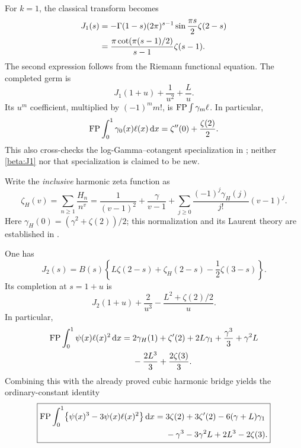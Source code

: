 For $k=1$, the classical transform becomes
\begin{align}\label{beta:J1}
 J_1(s)&=-\Gamma(1-s)(2\pi)^{s-1}
                \sin\frac{\pi s}{2}\zeta(2-s)\notag\\
 &=\frac{\pi\cot(\pi(s-1)/2)}{s-1}\zeta(s-1).
\end{align}
The second expression follows from the Riemann functional equation.
The completed germ is
\begin{equation}\label{beta:J1completion}
 J_1(1+u)+\frac1{u^2}+\frac L u.
\end{equation}
Its $u^m$ coefficient, multiplied by $(-1)^m m!$, is
$\operatorname{FP}\int\gamma_m\ell$. In particular,
\begin{equation}\label{beta:firstmoment}
 \operatorname{FP}\int_0^1\gamma_0(x)\ell(x)\,\mathrm d x
 =\zeta''(0)+\frac{\zeta(2)}2.
\end{equation}
This also cross-checks the log-Gamma--cotangent specialization in
\cite{RepoExact}; neither \eqref{beta:J1} nor that specialization is
claimed to be new.

Write the \emph{inclusive} harmonic zeta function as
\begin{equation}\label{beta:Hzeta}
 \zeta_H(v)=\sum_{n\geq1}\frac{H_n}{n^v}
 =\frac1{(v-1)^2}+\frac\gamma{v-1}
  +\sum_{j\geq0}\frac{(-1)^j\gamma_H(j)}{j!}(v-1)^j.
\end{equation}
Here $\gamma_H(0)=(\gamma^2+\zeta(2))/2$; this normalization and
its Laurent theory are established in \cite{Kargin,Can}.

\begin{theorem}\label{beta:secondmoment}
One has
\begin{equation}\label{beta:J2}
 J_2(s)=B(s)\left\{L\zeta(2-s)+\zeta_H(2-s)
                       -\frac12\zeta(3-s)\right\}.
\end{equation}
Its completion at $s=1+u$ is
\begin{equation}\label{beta:J2completion}
 J_2(1+u)+\frac2{u^3}-\frac{L^2+\zeta(2)/2}{u}.
\end{equation}
In particular,
\begin{align}\label{beta:P2}
 \operatorname{FP}\int_0^1\psi(x)\ell(x)^2\,\mathrm d x
 ={}&2\gamma_H(1)+\zeta'(2)+2L\gamma_1
    +\frac{\gamma^3}3+\gamma^2L\notag\\
   &-\frac{2L^3}3+\frac{2\zeta(3)}3.
\end{align}
Combining this with the already proved cubic harmonic bridge yields
the ordinary-constant identity
\begin{align}\label{beta:cancellation}
 \boxed{\begin{aligned}
 \operatorname{FP}\int_0^1\bigl\{\psi(x)^3-3\psi(x)\ell(x)^2\bigr\}\,\mathrm d x
 ={}&3\zeta(2)+3\zeta'(2)-6(\gamma+L)\gamma_1\\
   &-\gamma^3-3\gamma^2L+2L^3-2\zeta(3).
 \end{aligned}}
\end{align}
\end{theorem}

